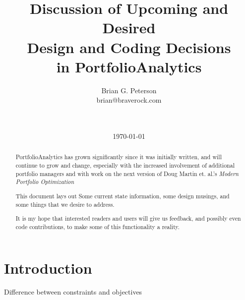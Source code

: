 \documentclass[12pt,letterpaper,english]{article}
\renewcommand{\baselinestretch}{1.3}
\begin{document}
\vspace{-2cm}
\renewcommand{\baselinestretch}{1}
\title{Discussion of Upcoming and Desired \\ Design and Coding Decisions \\ in PortfolioAnalytics\citet{PortfolioAnalytics}}



\author{
Brian G. Peterson\\
brian@braverock.com \\ \\ \\ }

\date{\today}

\maketitle
\thispagestyle{empty} %

\renewcommand{\baselinestretch}{1}
\begin{abstract}
PortfolioAnalytics has grown significantly since it was initially written, and will continue to grow and change, especially with the increased involvement of additional portfolio managers and with work on the next version of Doug Martin et. al.'s \emph{Modern Portfolio Optimization}\citep{Scherer2005}

This document lays out Some current state information, some design musings, and some things that we desire to address.

It is my hope that interested readers and users will give us feedback, and possibly even code contributions, to make some of this functionality a reality.
\end{abstract}


\newpage
\renewcommand{\baselinestretch}{1.3}

\tableofcontents

\newpage

\section{Introduction}
Difference between constraints and objectives
\end{document}
